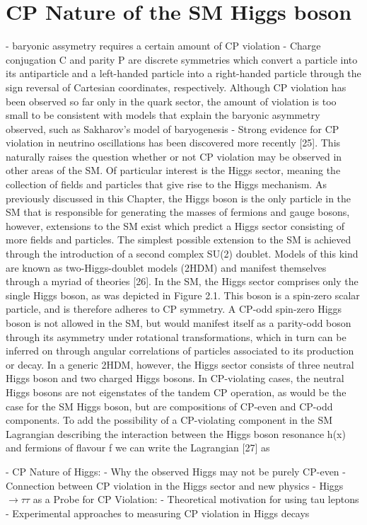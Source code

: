 \section{CP Nature of the SM Higgs boson}


- baryonic assymetry requires a certain amount of CP violation 
- Charge conjugation C and parity P are discrete symmetries
which convert a particle into its antiparticle and a left-handed particle into a right-handed
particle through the sign reversal of Cartesian coordinates, respectively. Although CP violation
has been observed so far only in the quark sector, the amount of violation is too small to be
consistent with models that explain the baryonic asymmetry observed, such as Sakharov’s
model of baryogenesis
- Strong evidence for CP violation in neutrino oscillations has been
discovered more recently [25]. This naturally raises the question whether or not CP violation
may be observed in other areas of the SM. Of particular interest is the Higgs sector, meaning
the collection of fields and particles that give rise to the Higgs mechanism. As previously
discussed in this Chapter, the Higgs boson is the only particle in the SM that is responsible
for generating the masses of fermions and gauge bosons, however, extensions to the SM exist which predict a Higgs sector consisting of more fields and particles. The simplest possible
extension to the SM is achieved through the introduction of a second complex SU(2) doublet.
Models of this kind are known as two-Higgs-doublet models (2HDM) and manifest themselves
through a myriad of theories [26].
In the SM, the Higgs sector comprises only the single Higgs boson, as was depicted in Figure 2.1.
This boson is a spin-zero scalar particle, and is therefore adheres to CP symmetry. A CP-odd
spin-zero Higgs boson is not allowed in the SM, but would manifest itself as a parity-odd
boson through its asymmetry under rotational transformations, which in turn can be inferred
on through angular correlations of particles associated to its production or decay. In a generic
2HDM, however, the Higgs sector consists of three neutral Higgs boson and two charged
Higgs bosons. In CP-violating cases, the neutral Higgs bosons are not eigenstates of the
tandem CP operation, as would be the case for the SM Higgs boson, but are compositions
of CP-even and CP-odd components. To add the possibility of a CP-violating component in
the SM Lagrangian describing the interaction between the Higgs boson resonance h(x) and
fermions of flavour f we can write the Lagrangian [27] as


- CP Nature of Higgs:
- Why the observed Higgs may not be purely CP-even
- Connection between CP violation in the Higgs sector and new physics
- Higgs $\rightarrow \tau \tau$ as a Probe for CP Violation:
- Theoretical motivation for using tau leptons
- Experimental approaches to measuring CP violation in Higgs decays